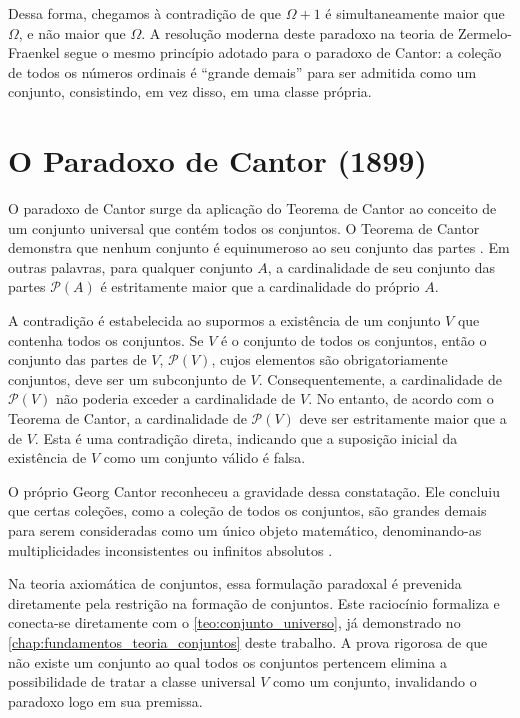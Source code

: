 Dessa forma, chegamos à contradição de que \(\Omega + 1\) é simultaneamente maior que \(\Omega\), e não maior que \(\Omega\). A resolução moderna deste paradoxo na teoria de Zermelo-Fraenkel segue o mesmo princípio adotado para o paradoxo de Cantor: a coleção de todos os números ordinais é ``grande demais'' para ser admitida como um conjunto, consistindo, em vez disso, em uma classe própria.

\section{O Paradoxo de Cantor (1899)}

O paradoxo de Cantor surge da aplicação do Teorema de Cantor ao conceito de um conjunto universal que contém todos os conjuntos. O Teorema de Cantor demonstra que nenhum conjunto é equinumeroso ao seu conjunto das partes \parencite[p.~132]{enderton1977}. Em outras palavras, para qualquer conjunto \(A\), a cardinalidade de seu conjunto das partes \(\mathcal{P}(A)\) é estritamente maior que a cardinalidade do próprio \(A\).

A contradição é estabelecida ao supormos a existência de um conjunto \(V\) que contenha todos os conjuntos. Se \(V\) é o conjunto de todos os conjuntos, então o conjunto das partes de \(V\), \(\mathcal{P}(V)\), cujos elementos são obrigatoriamente conjuntos, deve ser um subconjunto de \(V\). Consequentemente, a cardinalidade de \(\mathcal{P}(V)\) não poderia exceder a cardinalidade de \(V\). No entanto, de acordo com o Teorema de Cantor, a cardinalidade de \(\mathcal{P}(V)\) deve ser estritamente maior que a de \(V\). Esta é uma contradição direta, indicando que a suposição inicial da existência de \(V\) como um conjunto válido é falsa.

O próprio Georg Cantor reconheceu a gravidade dessa constatação. Ele concluiu que certas coleções, como a coleção de todos os conjuntos, são grandes demais para serem consideradas como um único objeto matemático, denominando-as multiplicidades inconsistentes ou infinitos absolutos \parencite[p.~48]{rucker2019}.

Na teoria axiomática de conjuntos, essa formulação paradoxal é prevenida diretamente pela restrição na formação de conjuntos. Este raciocínio formaliza e conecta-se diretamente com o \autoref{teo:conjunto_universo}, já demonstrado no \autoref{chap:fundamentos_teoria_conjuntos} deste trabalho. A prova rigorosa de que não existe um conjunto ao qual todos os conjuntos pertencem \parencite[p.~22]{enderton1977} elimina a possibilidade de tratar a classe universal \(V\) como um conjunto, invalidando o paradoxo logo em sua premissa.

